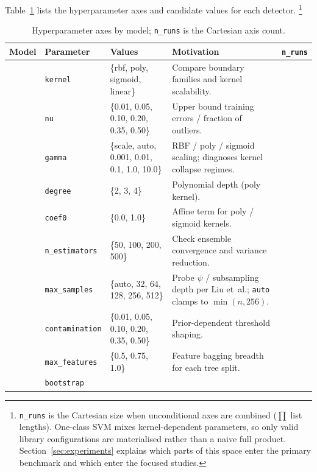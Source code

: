 \documentclass[cameraready]{Interspeech}
\begin{document}
\noindent Table~\ref{tab:model-grids} lists the hyperparameter axes and candidate values for each detector. \footnote{\texttt{n\_runs} is the Cartesian size when unconditional axes are combined (\(\prod\) list lengths). One-class SVM mixes kernel-dependent parameters, so only valid library configurations are materialised rather than a naive full product. Section~\ref{sec:experiments} explains which parts of this space enter the primary benchmark and which enter the focused studies.}

\begin{table}[!ht]
\centering
\small
\caption{Hyperparameter axes by model; \texttt{n\_runs} is the Cartesian axis count.}
\label{tab:model-grids}
\begin{tabularx}{\textwidth}{>{\raggedright\arraybackslash}p{1.35cm} >{\raggedright\arraybackslash}p{2.45cm} >{\raggedright\arraybackslash}p{2.95cm} >{\raggedright\arraybackslash}X >{\centering\arraybackslash}p{1.05cm}}
\toprule
\textbf{Model} & \textbf{Parameter} & \textbf{Values} & \textbf{Motivation} & \textbf{\texttt{n\_runs}} \\
\midrule
\multirow{5}{*}{OCSVM}
& \texttt{kernel}
& \{rbf, poly, sigmoid, linear\}
& Compare boundary families and kernel scalability.
& \multirow{5}{*}{$^\dagger$} \\
& \texttt{nu}
& \{0.01, 0.05, 0.10, 0.20, 0.35, 0.50\}
& Upper bound training errors / fraction of outliers.
& \\
& \texttt{gamma}
& \{scale, auto, 0.001, 0.01, 0.1, 1.0, 10.0\}
& RBF / poly / sigmoid scaling; diagnoses kernel collapse regimes.
& \\
& \texttt{degree}
& \{2, 3, 4\}
& Polynomial depth (poly kernel).
& \\
& \texttt{coef0}
& \{0.0, 1.0\}
& Affine term for poly / sigmoid kernels.
& \\
\midrule
\multirow{6}{*}{IForest}
& \texttt{n\_estimators}
& \{50, 100, 200, 500\}
& Check ensemble convergence and variance reduction.
& \multirow{6}{*}{1008} \\
& \texttt{max\_samples}
& \{auto, 32, 64, 128, 256, 512\}
& Probe \(\psi\) / subsampling depth per Liu et~al.; \texttt{auto} clamps to \(\min(n,256)\).
& \\
& \texttt{contamination}
& \{0.01, 0.05, 0.10, 0.20, 0.35, 0.50\}
& Prior-dependent threshold shaping.
& \\
& \texttt{max\_features}
& \{0.5, 0.75, 1.0\}
& Feature bagging breadth for each tree split.
& \\
& \texttt{bootstrap}

\end{tabularx}
\end{table}
\end{document}
